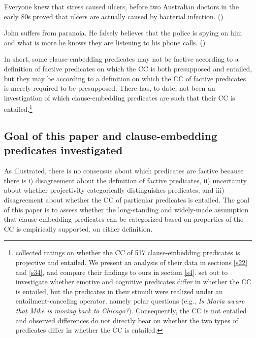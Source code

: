 \documentclass[11pt,fleqn]{article}
\newcommand{\6}{\mbox{$[\hspace*{-.6mm}[$}}
\newcommand{\9}{\mbox{$]\hspace*{-.6mm}]$}}
\begin{document}
\begin{exe}
\ex\label{know}
\begin{xlist}
\ex Everyone knew that stress caused ulcers, before two Australian doctors in the early 80s proved that ulcers are actually caused by bacterial infection. \hfill (\citealt[501]{hazlett2010})

\ex John suffers from paranoia. He falsely believes that the police is spying on him and what is more he knows they are listening to his phone calls. \hfill (\citealt[514]{abrusan2011})
\end{xlist}
\end{exe}

In short, some clause-embedding predicates may not be factive according to a definition of factive predicates on which the CC is both presupposed and entailed, but they may be according to a definition on which the CC of factive predicates is merely required to be presupposed. There has, to date, not been an investigation of which clause-embedding predicates are such that their CC is entailed.\footnote{\citet{white-rawlins-nels2018} collected ratings on whether the CC of 517 clause-embedding predicates is projective and entailed. We present an analysis of their data in sections \ref{s22} and  \ref{s34}, and compare their findings to ours in section \ref{s4}. \citet{djaerv-etal2016} set out to investigate whether emotive and cognitive predicates differ in whether the CC is entailed, but the predicates in their stimuli were realized under an entailment-canceling operator, namely polar questions (e.g., {\em Is Maria aware that Mike is moving back to Chicago?}). Consequently, the CC is not entailed and observed differences do not directly bear on whether the two types of predicates differ in whether the CC is entailed.} 

\subsection{Goal of this paper and clause-embedding predicates investigated}

As illustrated, there is no consensus about which predicates are factive because there is i) disagreement about the definition of factive predicates, ii) uncertainty about whether projectivity categorically distinguishes predicates, and iii) disagreement about whether the CC of particular predicates is entailed. The goal of this paper is to assess whether the long-standing and widely-made assumption that clause-embedding predicates can be categorized based on properties of the CC is empirically supported, on either definition.
\end{document}
